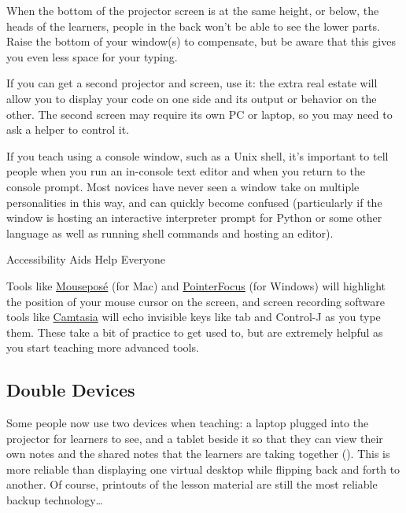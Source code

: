 When the bottom of the projector screen is at the same height, or
below, the heads of the learners, people in the back won't be able to
see the lower parts. Raise the bottom of your window(s) to compensate,
but be aware that this gives you even less space for your typing.

If you can get a second projector and screen, use it: the extra real
estate will allow you to display your code on one side and its output
or behavior on the other. The second screen may require its own PC or
laptop, so you may need to ask a helper to control it.

If you teach using a console window, such as a Unix shell, it's
important to tell people when you run an in-console text editor and
when you return to the console prompt. Most novices have never seen a
window take on multiple personalities in this way, and can quickly
become confused (particularly if the window is hosting an interactive
interpreter prompt for Python or some other language as well as
running shell commands and hosting an editor).

\begin{callout}{Accessibility Aids Help Everyone}

  Tools like
  \href{https://boinx.com/mousepose/overview/}{Mousepos\'{e}} (for
  Mac) and \href{http://www.pointerfocus.com/}{PointerFocus} (for
  Windows) will highlight the position of your mouse cursor on the
  screen, and screen recording software tools like
  \href{https://www.techsmith.com/video-editor.html}{Camtasia} will
  echo invisible keys like tab and Control-J as you type them.  These
  take a bit of practice to get used to, but are extremely helpful as
  you start teaching more advanced tools.

\end{callout}

\subsection*{Double Devices}

Some people now use two devices when teaching: a laptop plugged into
the projector for learners to see, and a tablet beside it so that they
can view their own notes and the shared notes that the learners are
taking together (). This is more
reliable than displaying one virtual desktop while flipping back and
forth to another.  Of course, printouts of the lesson material are
still the most reliable backup technology{\ldots}

